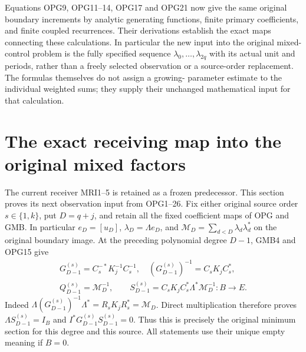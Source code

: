 \documentclass[11pt,a4paper]{article}
\begin{document}
Equations OPG9, OPG11--14, OPG17 and OPG21 now give the same
original boundary increments by analytic generating functions,
finite primary coefficients, and finite coupled recurrences.
Their derivations establish the exact maps connecting these
calculations. In particular the new input into the original
mixed-control problem is the fully specified sequence
$\lambda_0,\ldots,\lambda_{2q}$ with its actual unit and periods,
rather than a freely selected observation or a source-order
replacement. The formulas themselves do not assign a growing-
parameter estimate to the individual weighted sums; they supply
their unchanged mathematical input for that calculation.



\section{The exact receiving map into the original mixed factors}
\label{sec:OPR}

The current receiver MRI1--5 is retained as a frozen predecessor.
This section proves its next observation input from OPG1--26.
Fix either original source order $s\in\{1,k\}$, put $D=q+j$,
and retain all the fixed coefficient maps of OPG and GMB.
In particular $e_D=[u_D]$, $\lambda_D=\Lambda e_D$, and
$\mathcal M_D=\sum_{d<D}\lambda_d\lambda_d^*$ on the original
boundary image. At the preceding polynomial degree $D-1$, GMB4
and OPG15 give
\[
\begin{gathered}
 G_{D-1}^{(s)}=C_s^{-*}K_j^{-1}C_s^{-1},\quad
 (G_{D-1}^{(s)})^{-1}=C_sK_jC_s^*,\\
 Q_{D-1}^{(s)}=\mathcal M_D^{-1},\qquad
 S_{D-1}^{(s)}=C_sK_jC_s^*\Lambda^*\mathcal M_D^{-1}:B\to E.
\end{gathered}\tag{OPR1}
\]
Indeed $\Lambda(G_{D-1}^{(s)})^{-1}\Lambda^*=
R_sK_jR_s^*=\mathcal M_D$. Direct multiplication therefore
proves $\Lambda S_{D-1}^{(s)}=I_B$ and
$I^*G_{D-1}^{(s)}S_{D-1}^{(s)}=0$. Thus this is precisely
the original minimum section for this degree and this source.
All statements use their unique empty meaning if $B=0$.
\end{document}
